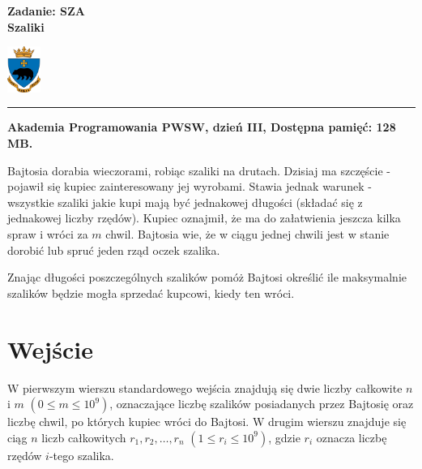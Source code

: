 \documentclass[10pt]{article}
\begin{document}
    

    \noindent
    \begin{minipage}{0.5\textwidth}
        \LARGE{\textsf{\textbf{Zadanie: SZA\\Szaliki}}}
    \end{minipage}
    \begin{minipage}{0.5\textwidth}
        \begin{flushright}
            \includegraphics[height=1.5cm]{logo.jpg}
        \end{flushright}
    \end{minipage}
    
    \noindent\rule{\textwidth}{0.4pt}
    
    \noindent\textbf{Akademia Programowania PWSW, dzień III, Dostępna pamięć: 128 MB.}
    \vspace{1em}
    
    
    \noindent
    Bajtosia dorabia wieczorami, robiąc szaliki na drutach. Dzisiaj ma szczęście - pojawił się kupiec zainteresowany jej wyrobami. Stawia jednak warunek - wszystkie szaliki jakie kupi mają być jednakowej długości (składać się z jednakowej liczby rzędów). Kupiec oznajmił, że ma do załatwienia jeszcza kilka spraw i wróci za $m$ chwil. Bajtosia wie, że w ciągu jednej chwili jest w stanie dorobić lub spruć jeden rząd oczek szalika.
    
    Znając długości poszczególnych szalików pomóż Bajtosi określić ile maksymalnie szalików będzie mogła sprzedać kupcowi, kiedy ten wróci.


    \section*{Wejście}
    
    W pierwszym wierszu standardowego wejścia znajdują się dwie liczby całkowite $n$ i $m$ $(0\leq m\leq 10^{9})$, oznaczające liczbę szalików posiadanych przez Bajtosię oraz liczbę chwil, po których kupiec wróci do Bajtosi. W drugim wierszu znajduje się ciąg $n$ liczb całkowitych $r_{1}, r_{2}, \ldots, r_{n}$ $(1 \leq r_{i} \leq 10^{9})$, gdzie $r_{i}$ oznacza liczbę rzędów $i$-tego szalika.

\end{document}
